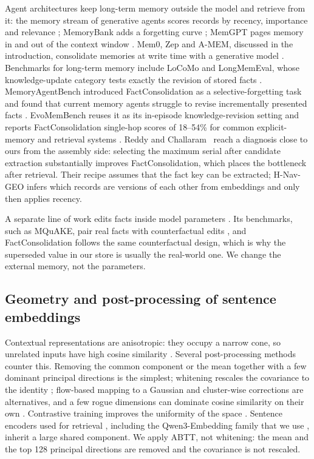 \documentclass[journal=jcisd8,manuscript=article]{achemso}
\newcommand{\geo}{H-Nav-GEO}
\begin{document}
Agent architectures keep long-term memory outside the model and retrieve from it: the memory stream of generative agents scores records by recency, importance and relevance \cite{park2023generative}; MemoryBank adds a forgetting curve \cite{zhong2024memorybank}; MemGPT pages memory in and out of the context window \cite{packer2023memgpt}. Mem0, Zep and A-MEM, discussed in the introduction, consolidate memories at write time with a generative model \cite{chhikara2025mem0,rasmussen2025zep,xu2025amem}. Benchmarks for long-term memory include LoCoMo \cite{maharana2024locomo} and LongMemEval, whose knowledge-update category tests exactly the revision of stored facts \cite{wu2025longmemeval}. MemoryAgentBench introduced FactConsolidation as a selective-forgetting task and found that current memory agents struggle to revise incrementally presented facts \cite{hu2026memoryagentbench}. EvoMemBench reuses it as its in-episode knowledge-revision setting and reports FactConsolidation single-hop scores of 18--54\% for common explicit-memory and retrieval systems \cite{wang2026evomembench}. Reddy and Challaram~\cite{reddy2026freshness} reach a diagnosis close to ours from the assembly side: selecting the maximum serial after candidate extraction substantially improves FactConsolidation, which places the bottleneck after retrieval. Their recipe assumes that the fact key can be extracted; \geo{} infers which records are versions of each other from embeddings and only then applies recency.

A separate line of work edits facts inside model parameters \cite{meng2022rome,meng2023memit}. Its benchmarks, such as MQuAKE, pair real facts with counterfactual edits \cite{zhong2023mquake,cohen2024ripple}, and FactConsolidation follows the same counterfactual design, which is why the superseded value in our store is usually the real-world one. We change the external memory, not the parameters.

\subsection{Geometry and post-processing of sentence embeddings}

Contextual representations are anisotropic: they occupy a narrow cone, so unrelated inputs have high cosine similarity \cite{ethayarajh2019contextual,gao2019degeneration,cai2021isotropy}. Several post-processing methods counter this. Removing the common component \cite{arora2017sif} or the mean together with a few dominant principal directions \cite{mu2018abtt} is the simplest; whitening rescales the covariance to the identity \cite{su2021whitening,huang2021whiteningbert}; flow-based mapping to a Gaussian \cite{li2020bertflow} and cluster-wise corrections \cite{rajaee2021cluster} are alternatives, and a few rogue dimensions can dominate cosine similarity on their own \cite{timkey2021roguedims}. Contrastive training improves the uniformity of the space \cite{gao2021simcse,wang2020alignment}. Sentence encoders used for retrieval \cite{reimers2019sbert}, including the Qwen3-Embedding family that we use \cite{zhang2025qwen3embedding}, inherit a large shared component. We apply ABTT, not whitening: the mean and the top 128 principal directions are removed and the covariance is not rescaled.
\end{document}
